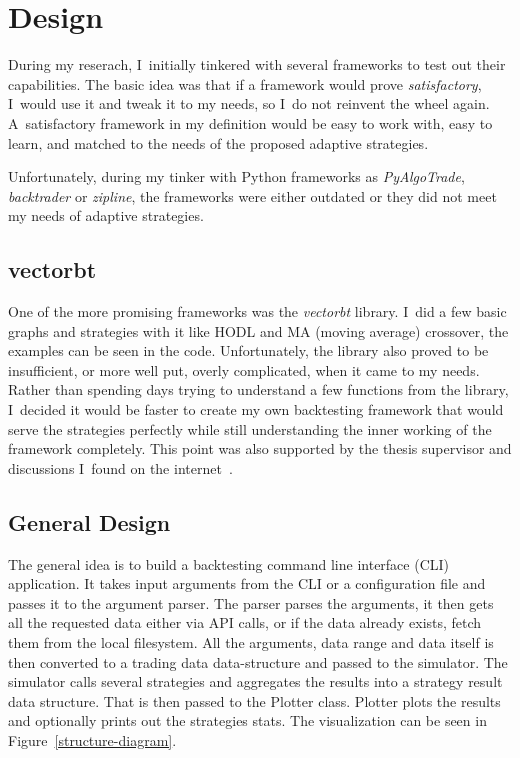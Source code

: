 \section{Design}
During my reserach, I~initially tinkered with several frameworks to test out their capabilities. The basic idea was that if a framework would prove \emph{satisfactory}, I~would use it and tweak it to my needs, so I~do not reinvent the wheel again. A~satisfactory framework in my definition would be easy to work with, easy to learn, and matched to the needs of the proposed adaptive strategies.

Unfortunately, during my tinker with Python frameworks as \emph{PyAlgoTrade}, \emph{backtrader} or \emph{zipline}, the frameworks were either outdated or they did not meet my needs of adaptive strategies.

\subsection*{vectorbt}
One of the more promising frameworks was the \emph{vectorbt} library. I~did a few basic graphs and strategies with it like HODL and MA (moving average) crossover, the examples can be seen in the code. Unfortunately, the library also proved to be insufficient, or more well put, overly complicated, when it came to my needs. Rather than spending days trying to understand a few functions from the library, I~decided it would be faster to create my own backtesting framework that would serve the strategies perfectly while still understanding the inner working of the framework completely. This point was also supported by the thesis supervisor and discussions I~found on the internet~\cite{reddit:custom-backtester}.

\subsection*{General Design}
The general idea is to build a backtesting command line interface (CLI) application. It takes input arguments from the CLI or a configuration file and passes it to the argument parser. The parser parses the arguments, it then gets all the requested data either via API calls, or if the data already exists, fetch them from the local filesystem. All the arguments, data range and data itself is then converted to a trading data data-structure and passed to the simulator. The simulator calls several strategies and aggregates the results into a strategy result data structure. That is then passed to the Plotter class. Plotter plots the results and optionally prints out the strategies stats. The visualization can be seen in Figure~\ref{structure-diagram}.

